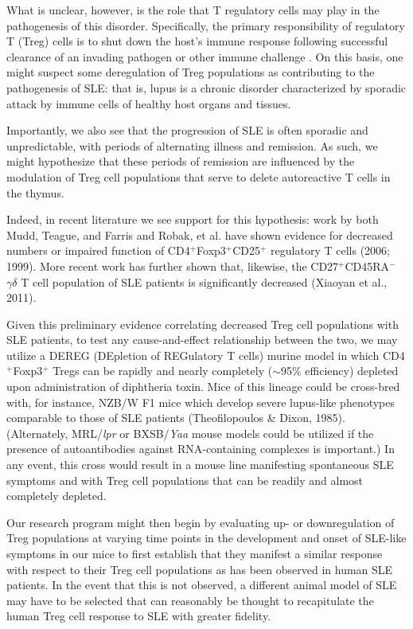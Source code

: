 \documentclass[11pt,letterpaper,final] {article}
\newcommand{\super}[1]{\ensuremath{^{\text{#1}}}}
\begin{document}
What is unclear, however, is the role that T regulatory cells may play in the pathogenesis of this disorder. Specifically, the primary responsibility of regulatory T (Treg) cells is to shut down the host's immune response following successful clearance of an invading pathogen or other immune challenge \cite{Shevach:2000}. On this basis, one might suspect some deregulation of Treg populations as contributing to the pathogenesis of SLE: that is, lupus is a chronic disorder characterized by sporadic attack by immune cells of healthy host organs and tissues.

Importantly, we also see that the progression of SLE is often sporadic and unpredictable, with periods of alternating illness and remission. As such, we might hypothesize that these periods of remission are influenced by the modulation of Treg cell populations that serve to delete autoreactive T cells in the thymus.

Indeed, in recent literature we see support for this hypothesis: work by both Mudd, Teague, and Farris and Robak, et al. have shown evidence for decreased numbers or impaired function of CD4\super{+}Foxp3\super{+}CD25\super{+} regulatory T cells (2006; 1999). More recent work has further shown that, likewise, the CD27\super{+}CD45RA\super{−} $\gamma\delta$ T cell population of SLE patients is significantly decreased (Xiaoyan et al., 2011).

Given this preliminary evidence correlating decreased Treg cell populations with SLE patients, to test any cause-and-effect relationship between the two, we may utilize a DEREG (DEpletion of REGulatory T cells) murine model in which CD4\super{+}Foxp3\super{+} Tregs can be rapidly and nearly completely ($\sim$95\% efficiency) depleted upon administration of diphtheria toxin. Mice of this lineage could be cross-bred with, for instance, NZB/W F1 mice which develop severe lupus-like phenotypes comparable to those of SLE patients (Theofilopoulos \& Dixon, 1985). (Alternately, MRL/\textit{lpr} or BXSB/\textit{Yaa} mouse models could be utilized if the presence of autoantibodies against RNA-containing complexes is important.) In any event, this cross would result in a mouse line manifesting spontaneous SLE symptoms and with Treg cell populations that can be readily and almost completely depleted.

Our research program might then begin by evaluating up- or downregulation of Treg populations at varying time points in the development and onset of SLE-like symptoms in our mice to first establish that they manifest a similar response with respect to their Treg cell populations as has been observed in human SLE patients. In the event that this is not observed, a different animal model of SLE may have to be selected that can reasonably be thought to recapitulate the human Treg cell response to SLE with greater fidelity.
\end{document}
